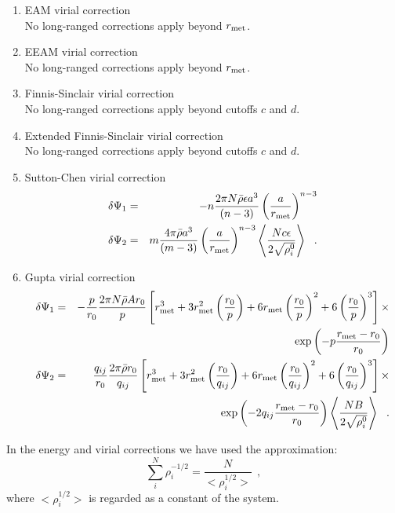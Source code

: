 \begin{enumerate}
\item EAM virial correction \\
No long-ranged corrections apply beyond $r_{\rm met}$.
\item EEAM virial correction \\
No long-ranged corrections apply beyond $r_{\rm met}$.
\item Finnis-Sinclair virial correction \\
No long-ranged corrections apply beyond cutoffs $c$ and $d$.
\item Extended Finnis-Sinclair virial correction \\
No long-ranged corrections apply beyond cutoffs $c$ and $d$.
\item Sutton-Chen virial correction
\begin{eqnarray}
\delta \Psi_{1} &=& -n \frac{2 \pi N \bar{\rho} \epsilon a^{3}}{(n-3)}
\left( \frac{a}{r_{\rm met}} \right)^{n-3} \nonumber \\
\delta \Psi_{2} &=& m \frac{4 \pi \bar{\rho} a^{3}}{(m-3)} \left( \frac{a}{r_{\rm met}} \right)^{n-3}
\left< \frac{N c \epsilon}{2\sqrt{\rho_{i}^{0}}} \right>~~.
\end{eqnarray}
\item Gupta virial correction
\begin{eqnarray}
\delta \Psi_{1} &=& -\frac{p}{r_{0}} \frac{2 \pi N \bar{\rho} A r_{0}}{p}
\left[ r_{\rm met}^{3} + 3 r_{\rm met}^{2} \left(\frac{r_{0}}{p}\right) +
6 r_{\rm met} \left(\frac{r_{0}}{p}\right)^{2} + 6 \left(\frac{r_{0}}{p}\right)^{3} \right] \times \nonumber \\
& & \exp \left( -p \frac{r_{\rm met}-r_{0}}{r_{0}}\right) \nonumber \\
\delta \Psi_{2} &=& \frac{q_{ij}}{r_{0}} \frac{2 \pi \bar{\rho} r_{0}}{q_{ij}}
\left[ r_{\rm met}^{3} + 3 r_{\rm met}^{2} \left(\frac{r_{0}}{q_{ij}}\right) +
6 r_{\rm met} \left(\frac{r_{0}}{q_{ij}}\right)^{2} + 6 \left(\frac{r_{0}}{q_{ij}}\right)^{3} \right] \times \\
& & \exp \left( -2 q_{ij} \frac{r_{\rm met}-r_{0}}{r_{0}}\right)
\left< \frac{N B}{2\sqrt{\rho_{i}^{0}}} \right>~~. \nonumber
\end{eqnarray}
\end{enumerate}

In the energy and virial corrections we have used the approximation:
\begin{equation}
\sum_{i}^{N}\rho_{i}^{-1/2} = \frac{N}{<\rho_{i}^{1/2}>}~~,
\end{equation}
where $<\rho_{i}^{1/2}>$ is regarded as a constant of the system.

